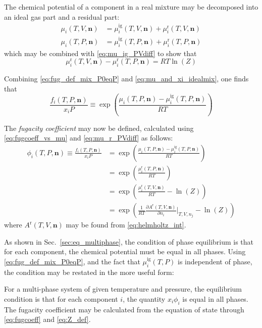 \documentclass[english]{../thermomemo/thermomemo}
\newcommand{\pone}[3]{\frac{\partial #1}{\partial #2}\bigg|_{#3}}%
\newcommand*{\vektor}[1]{\boldsymbol{#1}}%
\begin{document}
The chemical potential of a component in a real mixture may be decomposed into an ideal gas part and a residual part:
\begin{align}
  \mu_i(T,V,\vektor{n}) &= \mu_i^\text{ig}(T,V,\vektor{n}) + \mu_i^\text{r}(T,V,\vektor{n}) \nonumber\\
  \mu_i(T,P,\vektor{n}) &= \mu_i^\text{ig}(T,P,\vektor{n}) + \mu_i^\text{r}(T,P,\vektor{n})
  \label{}
\end{align}
which may be combined with \eqref{eq:mu_ig_PVdiff} to show that 
\begin{equation}
  \mu_i^\text{r}(T,V,\vektor{n}) - \mu_i^\text{r}(T,P,\vektor{n})
  =RT\ln \left( Z \right)
  \label{eq:mu_r_PVdiff}
\end{equation}

Combining \eqref{eq:fug_def_mix_P0eqP} and \eqref{eq:mu_and_xi_idealmix}, one finds that
\begin{equation}
  \frac{f_i(T,P,\vektor{n})}{x_i P} \equiv
  \exp\left( \frac{\mu_i(T,P,\vektor{n}) - \mu_i^\text{ig}(T,P,\vektor{n})}{RT} 
  \right)
  \label{eq:fugcoeff_vs_mu}
\end{equation}

The \textit{fugacity coefficient} may now be defined, calculated using \eqref{eq:fugcoeff_vs_mu} 
and \eqref{eq:mu_r_PVdiff} as follows:
\begin{align}
  \phi_i(T,P,\vektor{n}) \equiv \frac{f_i(T,P,\vektor{n})}{x_i P} &= 
  \exp\left( \frac{\mu_i(T,P,\vektor{n}) - \mu_i^\text{ig}(T,P,\vektor{n})}{RT}\right)
  \nonumber\\
  &= \exp\left( \frac{\mu_i^\text{r}(T,P,\vektor{n})}{RT} \right)
  \nonumber\\
  &= \exp\left( \frac{\mu_i^\text{r}(T,V,\vektor{n})}{RT} - \ln\left( Z \right) \right)
  \nonumber\\
  &= \exp\left( \frac{1}{RT}\pone{A^\text{r}(T,V,\vektor{n})}{n_i}{T,V,n_j} - \ln\left( Z \right) \right)
  \label{eq:fugcoeff}
\end{align}
where $A^\text{r}(T,V,\vektor{n})$ may be found from \eqref{eq:helmholtz_int}.

As shown in Sec.~\ref{sec:eq_multiphase}, the condition of phase equilibrium is that for each component, 
the chemical potential must be equal in all phases. Using \eqref{eq:fug_def_mix_P0eqP}, and the fact that 
$\mu_i^\text{ig}(T,P)$ is independent of phase, the condition may be restated in the more useful form:
\begin{framed}
  \noindent
  For a multi-phase system of given temperature and pressure, the equilibrium condition is that for each component $i$, the quantity 
  $x_i \phi_i$ is equal in all phases. The fugacity coefficient may be calculated from the equation of state through 
  \eqref{eq:fugcoeff} and \eqref{eq:Z_def}.
\end{framed}
\end{document}

